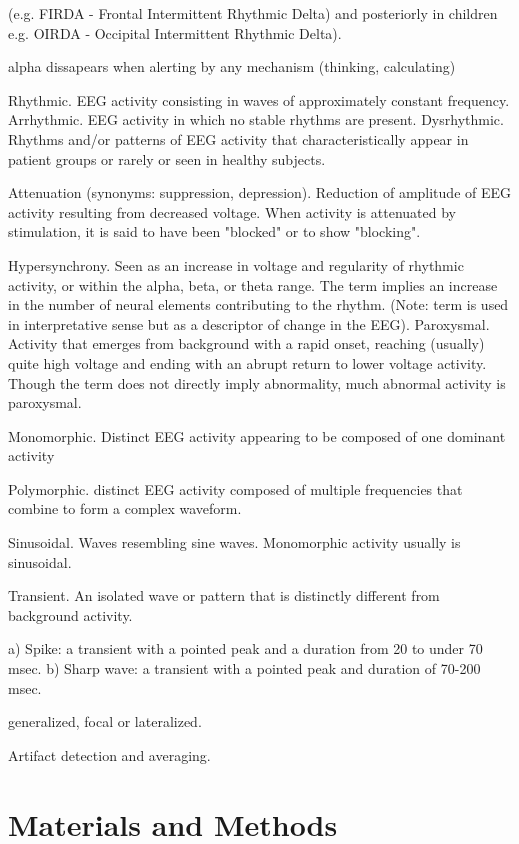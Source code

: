 \documentclass[sensors,article,submit,moreauthors,pdftex,10pt,a4paper]{mdpi}
\begin{document}
(e.g. FIRDA - Frontal Intermittent Rhythmic Delta) and posteriorly in children e.g. OIRDA - Occipital Intermittent Rhythmic Delta).

alpha dissapears when alerting by any mechanism (thinking, calculating)


Rhythmic. EEG activity consisting in waves of approximately constant frequency.
Arrhythmic. EEG activity in which no stable rhythms are present.
Dysrhythmic. Rhythms and/or patterns of EEG activity that characteristically appear in patient groups or rarely or seen in healthy subjects.

Attenuation (synonyms: suppression, depression). Reduction of amplitude of EEG activity resulting from decreased voltage. When activity is attenuated by stimulation, it is said to have been "blocked" or to show "blocking".

Hypersynchrony. Seen as an increase in voltage and regularity of rhythmic activity, or within the alpha, beta, or theta range. The term implies an increase in the number of neural elements contributing to the rhythm. (Note: term is used in interpretative sense but as a descriptor of change in the EEG).
Paroxysmal. Activity that emerges from background with a rapid onset, reaching (usually) quite high voltage and ending with an abrupt return to lower voltage activity. Though the term does not directly imply abnormality, much abnormal activity is paroxysmal.


Monomorphic. Distinct EEG activity appearing to be composed of one dominant activity

Polymorphic. distinct EEG activity composed of multiple frequencies that combine to form a complex waveform.

Sinusoidal. Waves resembling sine waves. Monomorphic activity usually is sinusoidal.

Transient. An isolated wave or pattern that is distinctly different from background activity.

a) Spike: a transient with a pointed peak and a duration from 20 to under 70 msec.
b) Sharp wave: a transient with a pointed peak and duration of 70-200 msec.



generalized, focal or lateralized.

Artifact detection and averaging.


\section{Materials and Methods}
\end{document}

